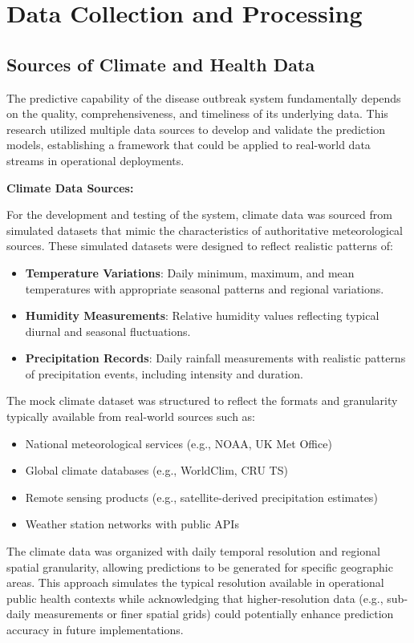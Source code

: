\documentclass[12pt,a4paper]{report}
\begin{document}
\chapter{Data Collection and Processing}
\section{Sources of Climate and Health Data}
The predictive capability of the disease outbreak system fundamentally depends on the quality, comprehensiveness, and timeliness of its underlying data. This research utilized multiple data sources to develop and validate the prediction models, establishing a framework that could be applied to real-world data streams in operational deployments.

\textbf{Climate Data Sources:}

For the development and testing of the system, climate data was sourced from simulated datasets that mimic the characteristics of authoritative meteorological sources. These simulated datasets were designed to reflect realistic patterns of:

\begin{itemize}
    \item \textbf{Temperature Variations}: Daily minimum, maximum, and mean temperatures with appropriate seasonal patterns and regional variations.
    \item \textbf{Humidity Measurements}: Relative humidity values reflecting typical diurnal and seasonal fluctuations.
    \item \textbf{Precipitation Records}: Daily rainfall measurements with realistic patterns of precipitation events, including intensity and duration.
\end{itemize}

The mock climate dataset was structured to reflect the formats and granularity typically available from real-world sources such as:

\begin{itemize}
    \item National meteorological services (e.g., NOAA, UK Met Office)
    \item Global climate databases (e.g., WorldClim, CRU TS)
    \item Remote sensing products (e.g., satellite-derived precipitation estimates)
    \item Weather station networks with public APIs
\end{itemize}

The climate data was organized with daily temporal resolution and regional spatial granularity, allowing predictions to be generated for specific geographic areas. This approach simulates the typical resolution available in operational public health contexts while acknowledging that higher-resolution data (e.g., sub-daily measurements or finer spatial grids) could potentially enhance prediction accuracy in future implementations.
\end{document}
